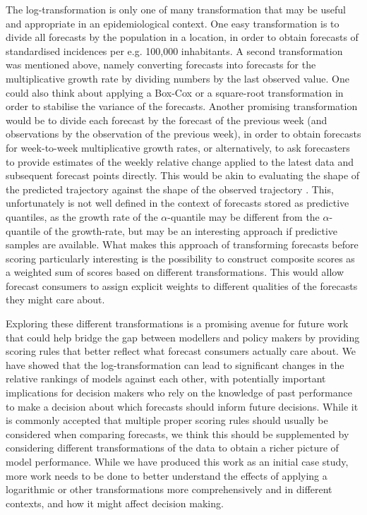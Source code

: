 \documentclass{article}
\begin{document}
The log-transformation is only one of many transformation that may be useful and appropriate in an epidemiological context. One easy transformation is to divide all forecasts by the population in a location, in order to obtain forecasts of standardised incidences per e.g. 100,000 inhabitants. A second transformation was mentioned above, namely converting forecasts into forecasts for the multiplicative growth rate by dividing numbers by the last observed value. One could also think about applying a Box-Cox or a square-root transformation in order to stabilise the variance of the forecasts. Another promising transformation would be to divide each forecast by the forecast of the previous week (and observations by the observation of the previous week), in order to obtain forecasts for week-to-week multiplicative growth rates, or alternatively, to ask forecasters to provide estimates of the weekly relative change applied to the latest data and subsequent forecast points directly. This would be akin to evaluating the shape of the predicted trajectory against the shape of the observed trajectory \citep[for a different approach to evaluation the shape of a forecast, see][]{srivastavaShapebasedEvaluationEpidemic2022}. This, unfortunately is not well defined in the context of forecasts stored as predictive quantiles, as the growth rate of the $\alpha$-quantile may be different from the $\alpha$-quantile of the growth-rate, but may be an interesting approach if predictive samples are available. What makes this approach of transforming forecasts before scoring particularly interesting is the possibility to construct composite scores as a weighted sum of scores based on different transformations. This would allow forecast consumers to assign explicit weights to different qualities of the forecasts they might care about. 

Exploring these different transformations is a promising avenue for future work that could help bridge the gap between modellers and policy makers by providing scoring rules that better reflect what forecast consumers actually care about. We have showed that the log-transformation can lead to significant changes in the relative rankings of models against each other, with potentially important implications for decision makers who rely on the knowledge of past performance to make a decision about which forecasts should inform future decisions. While it is commonly accepted that multiple proper scoring rules should usually be considered when comparing forecasts, we think this should be supplemented by considering different transformations of the data to obtain a richer picture of model performance. While we have produced this work as an initial case study, more work needs to be done to better understand the effects of applying a logarithmic or other transformations more comprehensively and in different contexts, and how it might affect decision making. 
\end{document}

